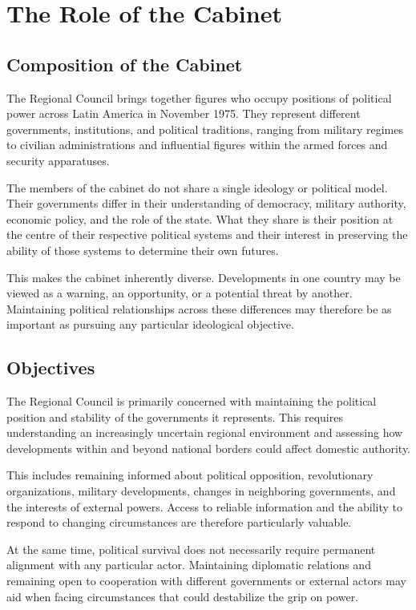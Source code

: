 \section{The Role of the Cabinet}

\subsection{Composition of the Cabinet}

The Regional Council brings together figures who occupy positions of political power across Latin America in November 1975. They represent different governments, institutions, and political traditions, ranging from military regimes to civilian administrations and influential figures within the armed forces and security apparatuses.

The members of the cabinet do not share a single ideology or political model. Their governments differ in their understanding of democracy, military authority, economic policy, and the role of the state. What they share is their position at the centre of their respective political systems and their interest in preserving the ability of those systems to determine their own futures.

This makes the cabinet inherently diverse. Developments in one country may be viewed as a warning, an opportunity, or a potential threat by another. Maintaining political relationships across these differences may therefore be as important as pursuing any particular ideological objective.

\subsection{Objectives}

The Regional Council is primarily concerned with maintaining the political position and stability of the governments it represents. This requires understanding an increasingly uncertain regional environment and assessing how developments within and beyond national borders could affect domestic authority.

This includes remaining informed about political opposition, revolutionary organizations, military developments, changes in neighboring governments, and the interests of external powers. Access to reliable information and the ability to respond to changing circumstances are therefore particularly valuable.

At the same time, political survival does not necessarily require permanent alignment with any particular actor. Maintaining diplomatic relations and remaining open to cooperation with different governments or external actors may aid when facing circumstances that could destabilize the grip on power.

